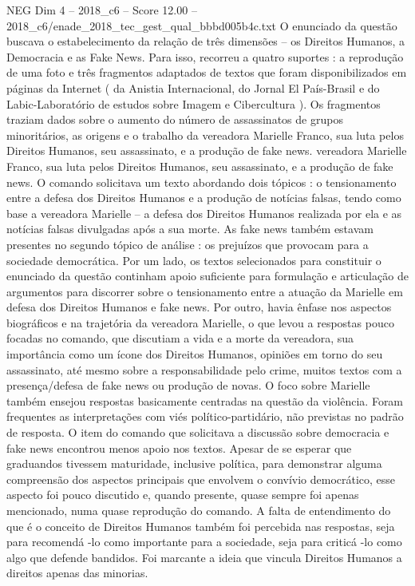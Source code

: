 \begin{textsample}{NEG Dim 4 – 2018\_c6 – Score 12.00 – 2018\_c6/enade\_2018\_tec\_gest\_qual\_bbbd005b4c.txt}
O enunciado da questão buscava o estabelecimento da relação de três dimensões – os Direitos Humanos, a Democracia e as Fake News.
Para isso, recorreu a quatro suportes : a reprodução de uma foto e três fragmentos adaptados de textos que foram disponibilizados em páginas da Internet ( da Anistia Internacional, do Jornal El País-Brasil e do Labic-Laboratório de estudos sobre Imagem e Cibercultura ).
Os fragmentos traziam dados sobre o aumento do número de assassinatos de grupos minoritários, as origens e o trabalho da vereadora Marielle Franco, sua luta pelos Direitos Humanos, seu assassinato, e a produção de fake news. vereadora Marielle Franco, sua luta pelos Direitos Humanos, seu assassinato, e a produção de fake news.
O comando solicitava um texto abordando dois tópicos : o tensionamento entre a defesa dos Direitos Humanos e a produção de notícias falsas, tendo como base a vereadora Marielle – a defesa dos Direitos Humanos realizada por ela e as notícias falsas divulgadas após a sua morte.
As fake news também estavam presentes no segundo tópico de análise : os prejuízos que provocam para a sociedade democrática.
Por um lado, os textos selecionados para constituir o enunciado da questão continham apoio suficiente para formulação e articulação de argumentos para discorrer sobre o tensionamento entre a atuação da Marielle em defesa dos Direitos Humanos e fake news.
Por outro, havia ênfase nos aspectos biográficos e na trajetória da vereadora Marielle, o que levou a respostas pouco focadas no comando, que discutiam a vida e a morte da vereadora, sua importância como um ícone dos Direitos Humanos, opiniões em torno do seu assassinato, até mesmo sobre a responsabilidade pelo crime, muitos textos com a presença/defesa de fake news ou produção de novas.
O foco sobre Marielle também ensejou respostas basicamente centradas na questão da violência.
Foram frequentes as interpretações com viés político-partidário, não previstas no padrão de resposta.
O item do comando que solicitava a discussão sobre democracia e fake news encontrou menos apoio nos textos.
Apesar de se esperar que graduandos tivessem maturidade, inclusive política, para demonstrar alguma compreensão dos aspectos principais que envolvem o convívio democrático, esse aspecto foi pouco discutido e, quando presente, quase sempre foi apenas mencionado, numa quase reprodução do comando.
A falta de entendimento do que é o conceito de Direitos Humanos também foi percebida nas respostas, seja para recomendá -lo como importante para a sociedade, seja para criticá -lo como algo que defende bandidos.
Foi marcante a ideia que vincula Direitos Humanos a direitos apenas das minorias.

\end{textsample}
